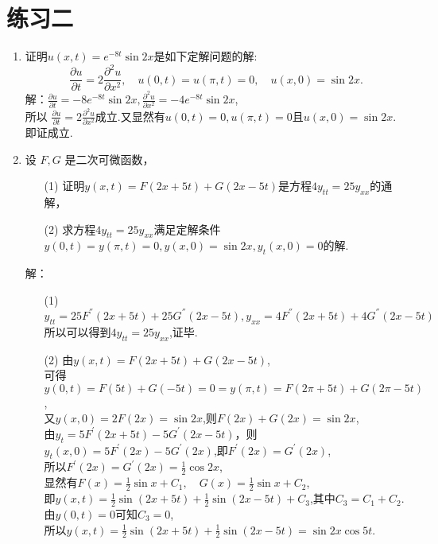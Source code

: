 \documentclass[11pt]{article}
\begin{document}
\section*{练习二}
    \begin{enumerate}
        \item 证明$u(x,t)=e^{-8t}\sin 2x$是如下定解问题的解:
            \begin{equation*}
            \frac{\partial u}{\partial t}=2\frac{\partial^2u}{\partial x^2},\quad u(0,t)=u(\pi,t)=0,\quad u(x,0)=\sin 2x.
            \end{equation*}
            解：$\frac{\partial u}{\partial t}=-8e^{-8t}\sin 2x,\frac{\partial^2u}{\partial x^2}=-4e^{-8t}\sin 2x$,\\所以
            $\frac{\partial u}{\partial t}=2\frac{\partial^2u}{\partial x^2}$成立.又显然有$u(0,t)=0,u(\pi,t)=0$且$u(x,0)=\sin 2x$.即证成立.

        \item  设 $F,G$ 是二次可微函数，
        \begin{enumerate}
            \item[(1)] 证明$y(x,t)=F(2x+5t)+G(2x-5t)$是方程$4y_{tt}=25y_{xx}$的通解，
            \item[(2)] 求方程$4y_{tt}=25y_{xx}$满足定解条件$y(0,t)=y(\pi,t)=0,y(x,0)=\sin 2x,y_t(x,0) = 0$的解.
        \end{enumerate}
        解：
        \begin{enumerate}
            \item[(1)] $y_{tt}=25F^{''}(2x+5t)+25G^{''}(2x-5t),y_{xx}=4F^{''}(2x+5t)+4G^{''}(2x-5t)$\\
                所以可以得到$4y_{tt}=25y_{xx}$,证毕.
            \item[(2)] 由$y(x,t)=F(2x+5t)+G(2x-5t)$,\\可得$y(0,t)=F(5t)+G(-5t)=0=y(\pi,t)=F(2\pi+5t)+G(2\pi-5t)$,\\又$y(x,0)=2F(2x)=\sin 2x$,则$F(2x)+G(2x)=\sin 2x$,\\
                由$y_t=5F^{'}(2x+5t)-5G^{'}(2x-5t)$，则$y_t(x,0)=5F^{'}(2x)-5G^{'}(2x)$,即$F^{'}(2x)=G^{'}(2x)$,\\所以$F^{'}(2x)=G^{'}(2x)=\frac{1}{2}\cos 2x$,\\显然有$F(x)=\frac{1}{2}\sin x+C_1,\quad G(x)=\frac{1}{2}\sin x +C_2$,\\
                即$y(x,t)=\frac{1}{2}\sin(2x+5t)+\frac{1}{2}\sin(2x-5t)+C_3$,其中$C_3=C_1+C_2$.\\由$y(0,t)=0$可知$C_3=0$,\\所以$y(x,t)=\frac{1}{2}\sin(2x+5t)+\frac{1}{2}\sin(2x-5t)=\sin2x\cos5t$.
        \end{enumerate}


\end{enumerate}
\end{document}
